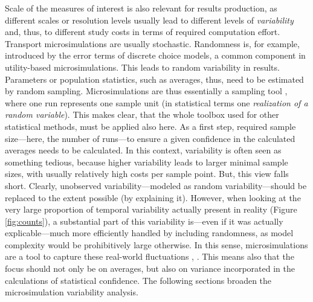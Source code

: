 Scale of the measures of interest is also relevant for results production, as different scales or resolution levels usually lead to different levels of \emph{variability} and, thus, to different study costs in terms of required computation effort. Transport microsimulations are usually stochastic. Randomness is, for example, introduced by the error terms of discrete choice models, a common component in utility-based microsimulations. This leads to random variability in results. Parameters or population statistics, such as averages, thus, need to be estimated by random sampling. Microsimulations are thus essentially a sampling tool \citep[][]{WolfDA_CSP_2001}, where one run represents one sample unit (in statistical terms one \emph{realization of a random variable}). This makes clear, that the whole toolbox used for other statistical methods, must be applied also here. As a first step, required sample size---here, the number of runs---to ensure a given confidence in the calculated averages needs to be calculated. In this context, variability is often seen as something tedious, because higher variability leads to larger minimal sample sizes, with usually relatively high costs per sample point. But, this view falls short. Clearly, unobserved variability---modeled as random variability---should be replaced to the extent possible (by explaining it). However, when looking at the very large proportion of temporal variability actually present in reality (Figure \ref{fig:counts}), a substantial part of this variability is---even if it was actually explicable---much more efficiently handled by including randomness, as model complexity would be prohibitively large otherwise. In this sense, microsimulations are a tool to capture these real-world fluctuations \citep[][p.11]{NewmanMEJBarkema_1999}, \citep[][p.704]{EsserNagel2001iatbr00-book}. This means also that the focus should not only be on averages, but also on variance incorporated in the calculations of statistical confidence. The following sections broaden the microsimulation variability analysis.

